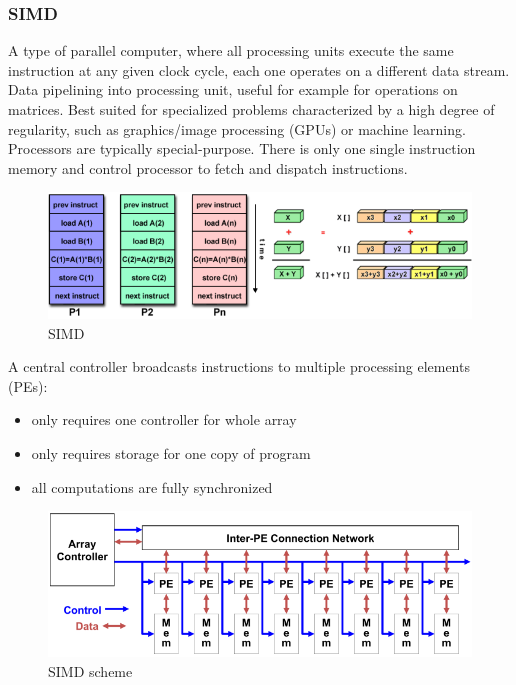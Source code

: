 \subsubsection{SIMD}
A type of parallel computer, where all processing units execute the same instruction at any given clock cycle, each
one operates on a different data stream.
Data pipelining into processing unit, useful for example for operations on matrices.
Best suited for specialized problems characterized by a high degree of regularity, such as graphics/image processing
(GPUs) or machine learning.
Processors are typically special-purpose.
There is only one single instruction memory and control processor to fetch and dispatch instructions.

\begin{figure}[H]
    \centering
    \includegraphics[scale = 0.3]{images/simd}
    \caption{SIMD}
    \label{fig:simd}
\end{figure}

A central controller broadcasts instructions to
multiple processing elements (PEs):
\begin{itemize}
    \item only requires one controller for whole array
    \item only requires storage for one copy of program
    \item all computations are fully synchronized
\end{itemize}

\begin{figure}[H]
    \centering
    \includegraphics[scale = 0.3]{images/simd-scheme}
    \caption{SIMD scheme}
    \label{fig:simd-scheme}
\end{figure}


